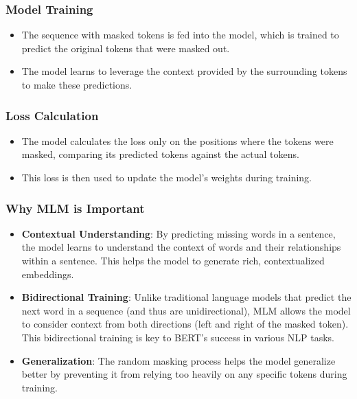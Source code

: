 \documentclass{article} %
\begin{document}
\subsubsection{Model Training}
\begin{itemize}
    \item The sequence with masked tokens is fed into the model, which is trained to predict the original tokens that were masked out.
    \item The model learns to leverage the context provided by the surrounding tokens to make these predictions.
\end{itemize}

\subsubsection{Loss Calculation}
\begin{itemize}
    \item The model calculates the loss only on the positions where the tokens were masked, comparing its predicted tokens against the actual tokens.
    \item This loss is then used to update the model's weights during training.
\end{itemize}

\subsubsection{Why MLM is Important}
\begin{itemize}
    \item \textbf{Contextual Understanding}: By predicting missing words in a sentence, the model learns to understand the context of words and their relationships within a sentence. This helps the model to generate rich, contextualized embeddings.
    \item \textbf{Bidirectional Training}: Unlike traditional language models that predict the next word in a sequence (and thus are unidirectional), MLM allows the model to consider context from both directions (left and right of the masked token). This bidirectional training is key to BERT's success in various NLP tasks.
    \item \textbf{Generalization}: The random masking process helps the model generalize better by preventing it from relying too heavily on any specific tokens during training.
\end{itemize}
\end{document}
